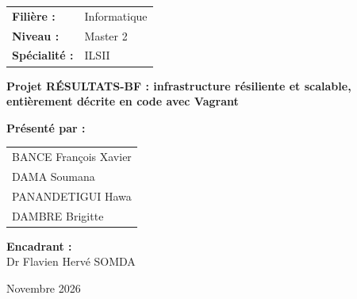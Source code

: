 \documentclass[11pt,a4paper,oneside]{report}
\begin{document}
\begin{titlepage}
		\vfill
		\begin{center}
			\large
			\begin{tabular}{@{}l l@{}}
				\textbf{Filière :}    & Informatique \\[0.15cm]
				\textbf{Niveau :}     & Master 2 \\[0.15cm]
				\textbf{Spécialité :} & ILSII
			\end{tabular}
		\end{center}
		
		\vfill
		\begin{center}
			\begin{tcolorbox}[enhanced,width=0.92\linewidth,center,arc=0pt,
				colback=white,colframe=vert,boxrule=3pt,
				halign=center,top=16pt,bottom=12pt,
				title={THÈME},fonttitle=\large\bfseries,coltitle=black,
				attach boxed title to top center={yshift=-\tcboxedtitleheight/2},
				boxed title style={colback=white,colframe=vert,boxrule=2pt,arc=0pt}]
				{\Large\bfseries Projet RÉSULTATS-BF : infrastructure résiliente et scalable,
					entièrement décrite en code avec Vagrant}
			\end{tcolorbox}
		\end{center}
		
		\vfill
		\noindent
		\begin{minipage}[t]{0.55\textwidth}
			\textbf{\large Présenté par :}\\[6pt]
			\begin{tabular}{@{}l@{}}
				BANCE François Xavier \\[3pt]
				DAMA Soumana \\[3pt]
				PANANDETIGUI Hawa \\[3pt]
				DAMBRE Brigitte
			\end{tabular}
		\end{minipage}%
		\hfill
		\begin{minipage}[t]{0.40\textwidth}\raggedleft
			\textbf{\large Encadrant :}\\[6pt]
			\large Dr Flavien Hervé SOMDA
		\end{minipage}
		
		\vfill
		\begin{center}{\large Novembre 2026}\end{center}
	\end{titlepage}
	\restoregeometry
	
	\tableofcontents
	\clearpage
	
\end{document}
